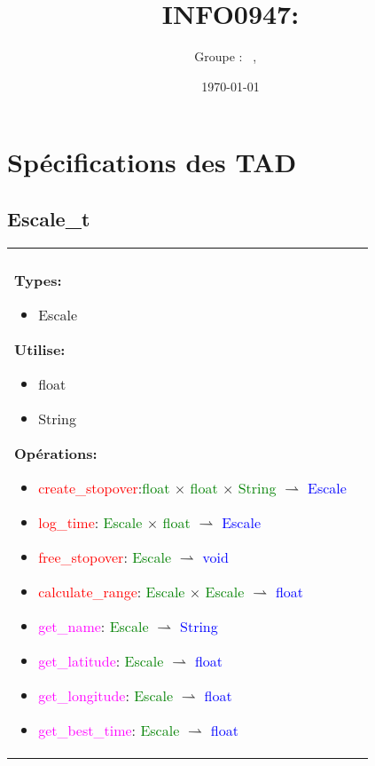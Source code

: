 \documentclass[a4paper, 11pt, oneside]{article}
\title{INFO0947: \intitule}
\author{Groupe \GrNbr : \PrenomUN~\textsc{\NomUN}, \PrenomDEUX~\textsc{\NomDEUX}}
\date{\today}
\newcommand{\tablemat}{~}
\renewcommand{\tablemat}{\tableofcontents}
\begin{document}
\maketitle
\newpage
\tablemat
\newpage

\section{Spécifications des TAD}

	\subsection{Escale\_t}
		\begin{tabular}{|p{17cm}|c}
			\hline
			\\

			\textbf{Types:}
				\begin{itemize}
					\item[] Escale
				\end{itemize}

			\textbf{Utilise:}
				\begin{itemize}
					\item[] float
					\item[] String
				\end{itemize}

			\textbf{Opérations\footnotemark{}:}
				\begin{itemize}
					\item[] \textcolor{red}{create\_stopover}:\textcolor{green}{float} $\times$ \textcolor{green}{float} $\times$ \textcolor{green}{String} $\rightharpoonup$ \textcolor{blue}{Escale}
					\item[] \textcolor{red}{log\_time}: \textcolor{green}{Escale} $\times$ \textcolor{green}{float} $\rightharpoonup$ \textcolor{blue}{Escale}
					\item[] \textcolor{red}{free\_stopover}: \textcolor{green}{Escale} $\rightharpoonup$ \textcolor{blue}{void}
					\item[] \textcolor{red}{calculate\_range}: \textcolor{green}{Escale} $\times$ \textcolor{green}{Escale} $\rightharpoonup$ \textcolor{blue}{float}
					\item[] \textcolor{magenta}{get\_name}: \textcolor{green}{Escale} $\rightharpoonup$ \textcolor{blue}{String}
					\item[] \textcolor{magenta}{get\_latitude}: \textcolor{green}{Escale} $\rightharpoonup$ \textcolor{blue}{float}
					\item[] \textcolor{magenta}{get\_longitude}: \textcolor{green}{Escale} $\rightharpoonup$ \textcolor{blue}{float}
					\item[] \textcolor{magenta}{get\_best\_time}: \textcolor{green}{Escale} $\rightharpoonup$ \textcolor{blue}{float}
				\end{itemize}


\end{tabular}
\end{document}
